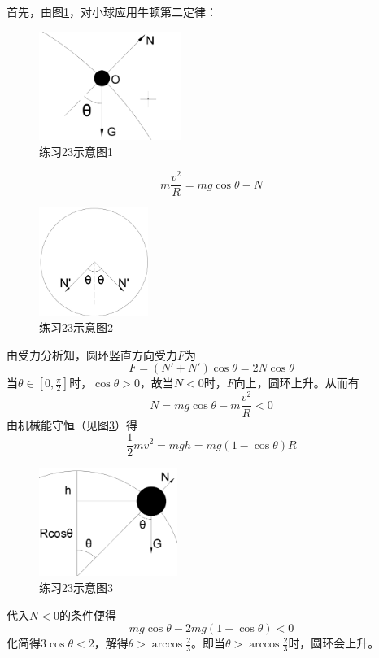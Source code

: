 \documentclass[b5paper,opensource,sourcefont,parskip]{qyxf-book}
\begin{document}

\solve 首先，由图\ref{fig:t23-1}，对小球应用牛顿第二定律：

\begin{figure}[htbp]
\centering
\includegraphics[height=100pt]{Chp2_illus2.png}
\caption{练习23示意图1}\label{fig:t23-1}
\end{figure}

\[m\dfrac{v^2}{R}=mg\cos\theta-N\]

\begin{figure}[htbp]
\centering
\includegraphics[height=100pt]{Chp2_illus3.png}
\caption{练习23示意图2}\label{fig:t23-2}
\end{figure}

由受力分析知，圆环竖直方向受力$F$为
\[
F=(N'+N')\cos\theta=2N\cos\theta
\]
当$\theta\in[0,\frac{\pi}{2}]$时，$\cos\theta>0$，故当$N<0$时，$F$向上，圆环上升。从而有
\[N=mg\cos\theta-m\frac{v^2}{R}<0\]
由机械能守恒（见图\ref{fig:t23-3}）得
\[\frac{1}{2}mv^2=mgh=mg(1-\cos\theta)R\]

\begin{figure}[htbp]
\centering
\includegraphics[height=100pt]{Chp2_illus4.png}
\caption{练习23示意图3}\label{fig:t23-3}
\end{figure}

代入$N<0$的条件便得
\[mg\cos\theta-2mg(1-\cos\theta)<0\]
化简得$3\cos\theta<2$，解得$\theta>\arccos\frac{2}{3}$。即当$\theta>\arccos\frac{2}{3}$时，圆环会上升。
\end{document}
